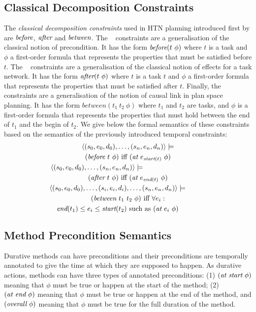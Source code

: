 \documentclass[letterpaper]{article} %
\newcommand{\at}{\text{\it at}}
\newcommand{\before}{\text{\it before}}
\newcommand{\after}{\text{\it after}}
\renewcommand{\between}{\text{\it between}}
\newcommand{\atstart}{\text{\it at start}}
\newcommand{\atend}{\text{\it at end}}
\newcommand{\overall}{\text{\it overall}}
\newcommand{\tstart}{\text{\it start}}
\newcommand{\tend}{\text{\it end}}
\begin{document}
\subsection{Classical Decomposition Constraints}

The {\em classical decomposition constraints} used in HTN planning introduced first by \citep{erol94} are $\before$, $\after$ and $\between$. The \before~ constraints are a generalisation of the classical notion of precondition. It has the form $\before(t\ \phi)$ where $t$ is a task and $\phi$ a first-order formula that represents the properties that must be satisfied before $t$. The \after~ constraints are a generalisation of the classical notion of effects for a task network. It has the form $\after(t\ \phi)$ where $t$ is a task $t$ and $\phi$ a first-order formula that represents the properties that must be satisfied after $t$. Finally, the \between~ constraints are a generalisation of the notion of causal link in plan space planning. It has the form $between(t_1\ t_2\ \phi)$ where $t_1$ and $t_2$ are tasks, and $\phi$ is a first-order formula that represents the properties that must hold between the end of $t_1$ and the begin of $t_2$. We give below the formal semantics of these constraints based on the semantics of the previously introduced temporal constraints:
\begin{multline*}
\langle (s_0, e_0, d_0), \ldots, (s_n, e_n, d_n) \rangle \models  \\
(\before \ t \ \phi) \  \text{iff} \ (\at \ e_{\tstart(t)} \ \phi) \\
\langle (s_0, e_0, d_0), \ldots, (s_n, e_n, d_n) \rangle \models  \qquad \qquad \qquad \qquad \quad\\
(\after \ t \ \phi) \  \text{iff} \ (\at \ e_{\tend(t)} \ \phi) \\
\langle (s_0, e_0, d_0), \ldots, (s_i, e_i, d_i), \ldots, (s_n, e_n, d_n) \rangle \models \qquad \quad \\
    (\between \ t_1 \ t_2 \ \phi) \ \text{iff} \ \forall e_i :  \\
\tend(t_1) \leq e_i \leq \tstart(t_2) \ \text{such as} \ (\at \ e_i \ \phi) \qquad \quad
\end{multline*}

\subsection{Method Precondition Semantics}

Durative methods can have preconditions and their preconditions are temporally annotated to give the time at which they are supposed to happen. As durative actions, methods can have three types of annotated preconditions: (1) $(\atstart \ \phi)$ meaning that $\phi$ must be true or happen at the start of the method; (2) $(\atend \ \phi)$ meaning that $\phi$ must be true or happen at the end of the method, and $(\overall \ \phi)$ meaning that $\phi$ must be true for the full duration of the method.
\end{document}
